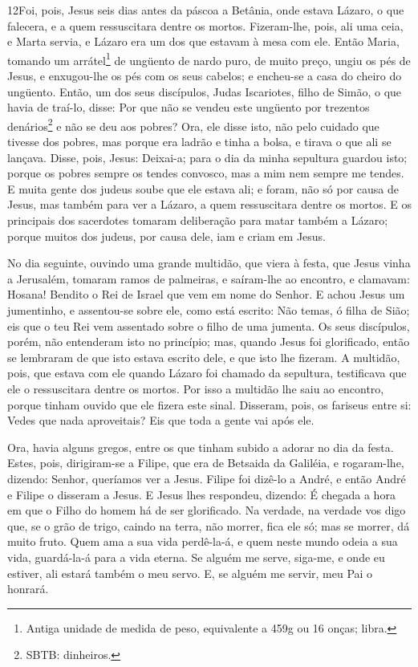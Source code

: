 \medskip

\lettrine{12} Foi, pois, Jesus seis dias antes da páscoa a
Betânia, onde estava Lázaro, o que falecera, e a quem ressuscitara
dentre os mortos. Fizeram-lhe, pois, ali uma ceia, e Marta
servia, e Lázaro era um dos que estavam à mesa com ele. Então
Maria, tomando um arrátel\footnote{Antiga unidade de medida de peso,
equivalente a 459g ou 16 onças; libra.} de ungüento de nardo puro,
de muito preço, ungiu os pés de Jesus, e enxugou-lhe os pés com os
seus cabelos; e encheu-se a casa do cheiro do ungüento. Então,
um dos seus discípulos, Judas Iscariotes, filho de Simão, o que
havia de traí-lo, disse: Por que não se vendeu este ungüento por
trezentos denários\footnote{SBTB: dinheiros.} e não se deu aos
pobres? Ora, ele disse isto, não pelo cuidado que tivesse dos
pobres, mas porque era ladrão e tinha a bolsa, e tirava o que ali se
lançava. Disse, pois, Jesus: Deixai-a; para o dia da minha
sepultura guardou isto; porque os pobres sempre os tendes
convosco, mas a mim nem sempre me tendes. E muita gente dos
judeus soube que ele estava ali; e foram, não só por causa de Jesus,
mas também para ver a Lázaro, a quem ressuscitara dentre os mortos.
E os principais dos sacerdotes tomaram deliberação para matar
também a Lázaro; porque muitos dos judeus, por causa dele,
iam e criam em Jesus.

No dia seguinte, ouvindo uma grande multidão, que viera à festa,
que Jesus vinha a Jerusalém, tomaram ramos de palmeiras, e
saíram-lhe ao encontro, e clamavam: Hosana! Bendito o Rei de Israel
que vem em nome do Senhor. E achou Jesus um jumentinho, e
assentou-se sobre ele, como está escrito: Não temas, ó filha
de Sião; eis que o teu Rei vem assentado sobre o filho de uma
jumenta. Os seus discípulos, porém, não entenderam isto no
princípio; mas, quando Jesus foi glorificado, então se lembraram de
que isto estava escrito dele, e que isto lhe fizeram. A
multidão, pois, que estava com ele quando Lázaro foi chamado da
sepultura, testificava que ele o ressuscitara dentre os mortos.
Por isso a multidão lhe saiu ao encontro, porque tinham
ouvido que ele fizera este sinal. Disseram, pois, os fariseus
entre si: Vedes que nada aproveitais? Eis que toda a gente vai após
ele.

Ora, havia alguns gregos, entre os que tinham subido a adorar no
dia da festa. Estes, pois, dirigiram-se a Filipe, que era de
Betsaida da Galiléia, e rogaram-lhe, dizendo: Senhor, queríamos ver
a Jesus. Filipe foi dizê-lo a André, e então André e Filipe o
disseram a Jesus. E Jesus lhes respondeu, dizendo: É chegada
a hora em que o Filho do homem há de ser glorificado. Na
verdade, na verdade vos digo que, se o grão de trigo, caindo na
terra, não morrer, fica ele só; mas se morrer, dá muito fruto.
Quem ama a sua vida perdê-la-á, e quem neste mundo odeia a
sua vida, guardá-la-á para a vida eterna. Se alguém me serve,
siga-me, e onde eu estiver, ali estará também o meu servo. E, se
alguém me servir, meu Pai o honrará.

